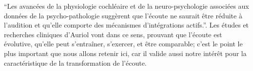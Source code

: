 \enquote {Les avancées de la physiologie cochléaire et de la neuro-psychologie associées aux données 
de la psycho-pathologie suggèrent que l'écoute ne saurait être réduite à l'audition et qu'elle comporte 
des mécanismes d'intégrations actifs.}\autocite[p.58]{auriol:cle}. Les études et recherches cliniques 
d'Auriol vont dans ce sens, prouvant que l'écoute est évolutive, qu'elle peut  s'entraîner, s'exercer, et  
être comparable;  
c'est le point le plus important que nous allons retenir ici,  car il valide aussi notre intérêt pour la 
caractéristique de la transformation de l'écoute. %

